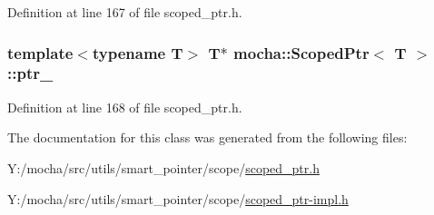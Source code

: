 Definition at line 167 of file scoped\_\-ptr.h.

\hypertarget{classmocha_1_1_scoped_ptr_a7c8c96fcbc408b028846ecc2e5f43c32}{
\subsubsection[{ptr\_\-}]{\setlength{\rightskip}{0pt plus 5cm}template$<$typename T$>$ T$\ast$ {\bf mocha::ScopedPtr}$<$ T $>$::{\bf ptr\_\-}}}
\label{classmocha_1_1_scoped_ptr_a7c8c96fcbc408b028846ecc2e5f43c32}


Definition at line 168 of file scoped\_\-ptr.h.



The documentation for this class was generated from the following files:\begin{DoxyCompactItemize}
\item 
Y:/mocha/src/utils/smart\_\-pointer/scope/\hyperlink{scoped__ptr_8h}{scoped\_\-ptr.h}\item 
Y:/mocha/src/utils/smart\_\-pointer/scope/\hyperlink{scoped__ptr-impl_8h}{scoped\_\-ptr-\/impl.h}\end{DoxyCompactItemize}
